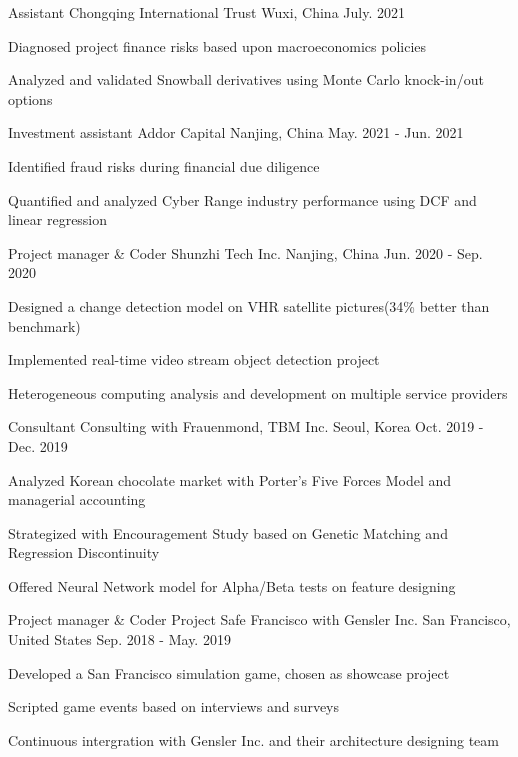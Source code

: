 \begin{cventries}
  \cventry
    {Assistant}
    {Chongqing International Trust}
    {Wuxi, China}
    {July. 2021}
    {
      \begin{cvitems}
        \item {Diagnosed project finance risks based upon macroeconomics policies}
        \item {Analyzed and validated Snowball derivatives using Monte Carlo knock-in/out options}
      \end{cvitems}
    }

  \cventry
    {Investment assistant}
    {Addor Capital}
    {Nanjing, China}
    {May. 2021 - Jun. 2021}
    {
      \begin{cvitems}
        \item {Identified fraud risks during financial due diligence}
        \item {Quantified and analyzed Cyber Range industry performance using DCF and linear regression}
      \end{cvitems}
    }

  \cventry
    {Project manager \& Coder}
    {Shunzhi Tech Inc.}
    {Nanjing, China}
    {Jun. 2020 - Sep. 2020}
    {
      \begin{cvitems}
        \item {Designed a change detection model on VHR satellite pictures(34\% better than benchmark)}
        \item {Implemented real-time video stream object detection project}
        \item {Heterogeneous computing analysis and development on multiple service providers}
      \end{cvitems}
    }

  \cventry
    {Consultant}
    {Consulting with Frauenmond, TBM Inc.}
    {Seoul, Korea}
    {Oct. 2019 - Dec. 2019}
    {
      \begin{cvitems}
        \item {Analyzed Korean chocolate market with Porter's Five Forces Model and managerial accounting}
        \item {Strategized with Encouragement Study based on Genetic Matching and Regression Discontinuity}
        \item {Offered Neural Network model for Alpha/Beta tests on feature designing}
      \end{cvitems}
    }

  \cventry
    {Project manager \& Coder}
    {Project Safe Francisco with Gensler Inc.}
    {San Francisco, United States}
    {Sep. 2018 - May. 2019}
    {
      \begin{cvitems}
        \item {Developed a San Francisco simulation game, chosen as showcase project}
        \item {Scripted game events based on interviews and surveys}
        \item {Continuous intergration with Gensler Inc. and their architecture designing team}
      \end{cvitems}
    }


\end{cventries}
